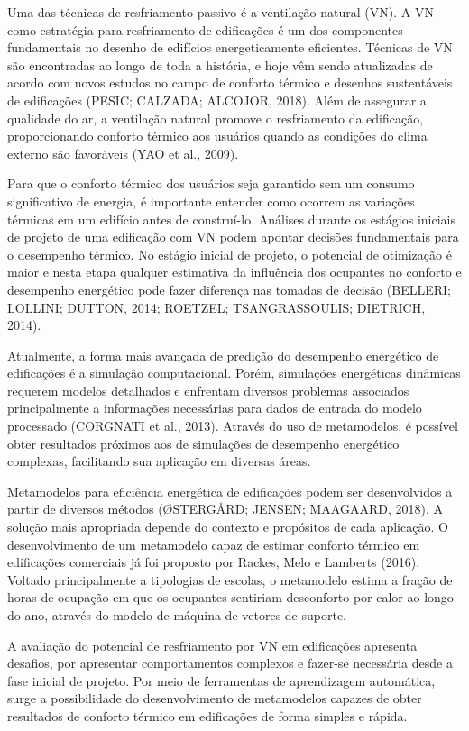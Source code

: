 \documentclass[brazil,hardcopy,openany,a5paper]{ufscthesis}
\begin{document}
	Uma das técnicas de resfriamento passivo é a ventilação natural (VN). A VN como estratégia para resfriamento de edificações é um dos componentes fundamentais no desenho de edifícios energeticamente eficientes. Técnicas de VN são encontradas ao longo de toda a história, e hoje vêm sendo atualizadas de acordo com novos estudos no campo de conforto térmico e desenhos sustentáveis de edificações (PESIC; CALZADA; ALCOJOR, 2018). Além de assegurar a qualidade do ar, a ventilação natural promove o resfriamento da edificação, proporcionando conforto térmico aos usuários quando as condições do clima externo são favoráveis (YAO et al., 2009).
	
	Para que o conforto térmico dos usuários seja garantido sem um consumo significativo de energia, é importante entender como ocorrem as variações térmicas em um edifício antes de construí-lo. Análises durante os estágios iniciais de projeto de uma edificação com VN podem apontar decisões fundamentais para o desempenho térmico. No estágio inicial de projeto, o potencial de otimização é maior e nesta etapa qualquer estimativa da influência dos ocupantes no conforto e desempenho energético pode fazer diferença nas tomadas de decisão (BELLERI; LOLLINI; DUTTON, 2014; ROETZEL; TSANGRASSOULIS; DIETRICH, 2014).
	
	Atualmente, a forma mais avançada de predição do desempenho energético de edificações é a simulação computacional. Porém, simulações energéticas dinâmicas requerem modelos detalhados e enfrentam diversos problemas associados principalmente a informações necessárias para dados de entrada do modelo processado (CORGNATI et al., 2013). Através do uso de metamodelos, é possível obter resultados próximos aos de simulações de desempenho energético complexas, facilitando sua aplicação em diversas áreas.
	
	Metamodelos para eficiência energética de edificações podem ser desenvolvidos a partir de diversos métodos (ØSTERGÅRD; JENSEN; MAAGAARD, 2018). A solução mais apropriada depende do contexto e propósitos de cada aplicação. O desenvolvimento de um metamodelo capaz de estimar conforto térmico em edificações comerciais já foi proposto por Rackes, Melo e Lamberts (2016). Voltado principalmente a tipologias de escolas, o metamodelo estima a fração de horas de ocupação em que os ocupantes sentiriam desconforto por calor ao longo do ano, através do modelo de máquina de vetores de suporte.
	
	A avaliação do potencial de resfriamento por VN em edificações apresenta desafios, por apresentar comportamentos complexos e fazer-se necessária desde a fase inicial de projeto. Por meio de ferramentas de aprendizagem automática, surge a possibilidade do desenvolvimento de metamodelos capazes de obter resultados de conforto térmico em edificações de forma simples e rápida. 
	
\end{document}

